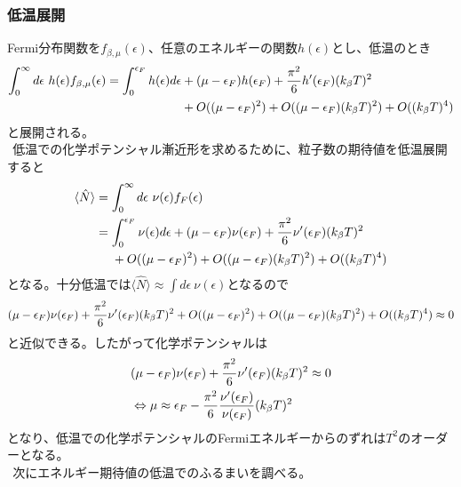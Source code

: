 \documentclass[dvipdfmx, 11pt, a4paper]{jsarticle}
\theoremstyle{definition}
\begin{document}
\subsubsection{低温展開}
    Fermi分布関数を$f_{\beta,\mu} (\epsilon)$、任意のエネルギーの関数$h (\epsilon)$とし、低温のとき
    \begin{align}
        \int_0^{\infty} d\epsilon\ h(\epsilon) f_{\beta,\mu} (\epsilon) = \int_0^{\epsilon_F} h(\epsilon) d\epsilon &+ (\mu - \epsilon_F)h(\epsilon_F) + \frac{\pi^2}{6} h'(\epsilon_F)(k_\beta T)^2 \notag \\
        &+ O((\mu - \epsilon_F)^2) +O((\mu - \epsilon_F)(k_\beta T)^2) + O((k_\beta T)^4)
    \end{align}
    と展開される。\\
    $\ \ $低温での化学ポテンシャル漸近形を求めるために、粒子数の期待値を低温展開すると
    \begin{align}
        \langle \hat{N} \rangle &= \int_0^{\infty} d\epsilon\ \nu (\epsilon) f_F(\epsilon) \notag \\
        &= \int_0^{\epsilon_F} \nu (\epsilon) d\epsilon + (\mu - \epsilon_F)\nu(\epsilon_F) + \frac{\pi^2}{6} \nu'(\epsilon_F)(k_\beta T)^2 \notag \\
        &\ \ \ \ + O((\mu - \epsilon_F)^2) +O((\mu - \epsilon_F)(k_\beta T)^2) + O((k_\beta T)^4) \notag 
    \end{align}
    となる。十分低温では$\langle \hat{N} \rangle \approx \int d\epsilon\ \nu(\epsilon)$となるので
    \begin{align}
        (\mu - \epsilon_F)\nu(\epsilon_F) + \frac{\pi^2}{6} \nu'(\epsilon_F)(k_\beta T)^2 + O((\mu - \epsilon_F)^2) +O((\mu - \epsilon_F)(k_\beta T)^2) + O((k_\beta T)^4) \approx 0\notag 
    \end{align}
    と近似できる。したがって化学ポテンシャルは
    \begin{align}
        &(\mu - \epsilon_F)\nu(\epsilon_F) + \frac{\pi^2}{6} \nu'(\epsilon_F)(k_\beta T)^2 \approx 0\notag \\
        &\Leftrightarrow \mu \approx \epsilon_F - \frac{\pi^2}{6} \frac{\nu'(\epsilon_F)}{\nu(\epsilon_F)}(k_\beta T)^2
    \end{align}
    となり、低温での化学ポテンシャルのFermiエネルギーからのずれは$T^2$のオーダーとなる。\\
    $\ \ $次にエネルギー期待値の低温でのふるまいを調べる。
\end{document}
